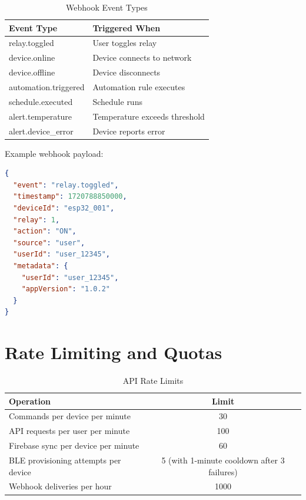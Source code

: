 \begin{table}[H]
\centering
\caption{Webhook Event Types}
\label{tbl:webhook_events}
\begin{tabular}{|l|l|}
\hline
\textbf{Event Type} & \textbf{Triggered When} \\
\hline
relay.toggled & User toggles relay \\
\hline
device.online & Device connects to network \\
\hline
device.offline & Device disconnects \\
\hline
automation.triggered & Automation rule executes \\
\hline
schedule.executed & Schedule runs \\
\hline
alert.temperature & Temperature exceeds threshold \\
\hline
alert.device\_error & Device reports error \\
\hline
\end{tabular}
\end{table}

Example webhook payload:

\begin{lstlisting}[language=json, caption=Webhook Event Payload, label=lst:webhook_payload]
{
  "event": "relay.toggled",
  "timestamp": 1720788850000,
  "deviceId": "esp32_001",
  "relay": 1,
  "action": "ON",
  "source": "user",
  "userId": "user_12345",
  "metadata": {
    "userId": "user_12345",
    "appVersion": "1.0.2"
  }
}
\end{lstlisting}

\section{Rate Limiting and Quotas}

\begin{table}[H]
\centering
\caption{API Rate Limits}
\label{tbl:rate_limits}
\begin{tabular}{|l|c|}
\hline
\textbf{Operation} & \textbf{Limit} \\
\hline
Commands per device per minute & 30 \\
\hline
API requests per user per minute & 100 \\
\hline
Firebase sync per device per minute & 60 \\
\hline
BLE provisioning attempts per device & 5 (with 1-minute cooldown after 3 failures) \\
\hline
Webhook deliveries per hour & 1000 \\
\hline
\end{tabular}
\end{table}

